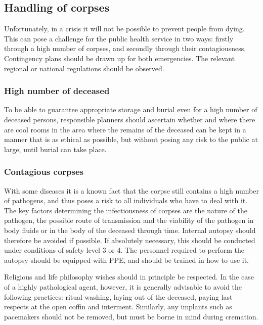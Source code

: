 \documentclass{article}
\begin{document}
\subsection{Handling of corpses}\label{H2090965}



Unfortunately, in a crisis it will not be possible to prevent people from dying. This can pose a challenge for the public health service in two ways: firstly through a high number of corpses, and secondly through their contagiousness. Contingency plans should be drawn up for both emergencies. The relevant regional or national regulations should be observed.


\subsubsection{High number of deceased}\label{H872531}



To be able to guarantee appropriate storage and burial even for a high number of deceased persons, responsible planners should ascertain whether and where there are cool rooms in the area where the remains of the deceased can be kept in a manner that is as ethical as possible, but without posing any risk to the public at large, until burial can take place.


\subsubsection{Contagious corpses}\label{H5224676}



With some diseases it is a known fact that the corpse still contains a high number of pathogens, and thus poses a risk to all individuals who have to deal with it. The key factors determining the infectiousness of corpses are the nature of the pathogen, the possible route of transmission and the viability of the pathogen in body fluids or in the body of the deceased through time. Internal autopsy should therefore be avoided if possible. If absolutely necessary, this should be conducted under conditions of safety level 3 or 4. The personnel required to perform the autopsy should be equipped with PPE, and should be trained in how to use it.


Religious and life philosophy wishes should in principle be respected. In the case of a highly pathological agent, however, it is generally advisable to avoid the following practices: ritual washing, laying out of the deceased, paying last respects at the open coffin and interment. Similarly, any implants such as pacemakers should not be removed, but must be borne in mind during cremation.
\end{document}
